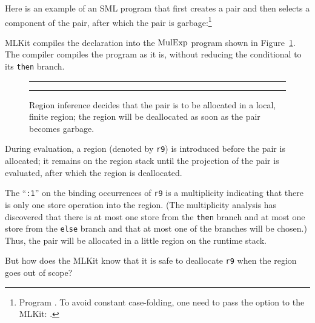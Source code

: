 \documentclass[12pt]{book}
\begin{document}
Here is an example of an SML program that first creates a pair and then selects
a component of the pair, after which the pair is garbage:\footnote{Program
. To avoid constant case-folding, one need to pass the option  to the MLKit:
.}
MLKit compiles the declaration into the $\hbox{\rm MulExp}$ program shown in
Figure~\ref{elimpair.fig}.  The compiler compiles the program as it is, without
reducing the conditional to its \lstinline{then} branch.
\begin{figure}
\hrule\medskip
{}
\caption{Region inference decides that the pair is to be allocated in a local,
  finite region; the region will be deallocated as soon as the pair becomes
  garbage.}
\medskip\hrule
\label{elimpair.fig}
\end{figure}
During evaluation, a region (denoted by \lstinline{r9}) is introduced before the pair
is allocated; it remains on the region stack until the projection of the pair is
evaluated, after which the region is deallocated.

The ``\lstinline{:1}'' on the binding occurrences of \lstinline{r9} is a multiplicity
indicating that there is only one store operation into the region. (The
%
%
multiplicity analysis has discovered that there is at most one store from the
\lstinline{then} branch and at most one store from the \lstinline{else} branch and that at
most one of the branches will be chosen.) Thus, the pair will be allocated in a
little region on the runtime stack.

But how does the MLKit know that it is safe to
%
%
deallocate \lstinline{r9} when the
%
%
region goes out of scope?
\end{document}
